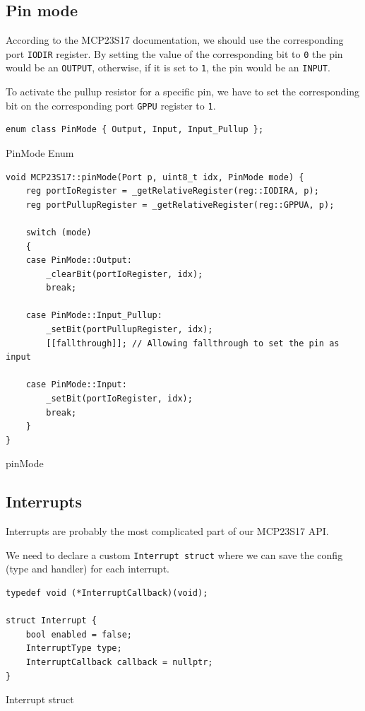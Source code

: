 \documentclass{article}
\begin{document}
\subsection{Pin mode}

According to the MCP23S17 documentation, we should use the corresponding port \verb|IODIR| register. By setting the value of the corresponding bit to \verb|0| the pin would be an \verb|OUTPUT|, otherwise, if it is set to \verb|1|, the pin would be an \verb|INPUT|.

To activate the pullup resistor for a specific pin, we have to set the corresponding bit on the corresponding port \verb|GPPU| register to \verb|1|.

\begin{listing}[H]
\begin{verbatim}
enum class PinMode { Output, Input, Input_Pullup };
\end{verbatim}
\caption{PinMode Enum}
\end{listing}

\begin{listing}[H]
\begin{verbatim}
void MCP23S17::pinMode(Port p, uint8_t idx, PinMode mode) {
    reg portIoRegister = _getRelativeRegister(reg::IODIRA, p);
    reg portPullupRegister = _getRelativeRegister(reg::GPPUA, p);

    switch (mode)
    {
    case PinMode::Output:
        _clearBit(portIoRegister, idx);
        break;

    case PinMode::Input_Pullup:
        _setBit(portPullupRegister, idx);
        [[fallthrough]]; // Allowing fallthrough to set the pin as input
        
    case PinMode::Input:
        _setBit(portIoRegister, idx);
        break;
    }
}
\end{verbatim}
\caption{pinMode}
\end{listing}

\subsection{Interrupts}

Interrupts are probably the most complicated part of our MCP23S17 API.

We need to declare a custom \verb|Interrupt struct| where we can save the config (type and handler) for each interrupt.

\begin{listing}[H]
\begin{verbatim}
typedef void (*InterruptCallback)(void);

struct Interrupt {
    bool enabled = false;
    InterruptType type;
    InterruptCallback callback = nullptr;
}
\end{verbatim}
\caption{Interrupt struct}
\end{listing}
\end{document}
